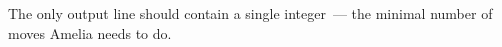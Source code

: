 The only output line should contain a single integer~--- the minimal number of moves Amelia needs to do. 